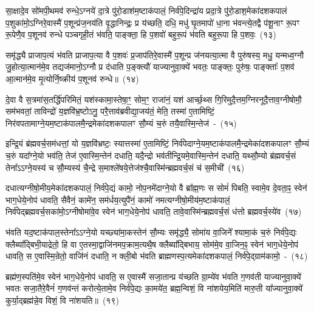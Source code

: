 सा॒क्षादे॒व सो॑मपी॒थमव॑ रुन्धे॒\-ऽग्नये॑ दा॒त्रे पु॑रो॒डाश॑म॒ष्टा\-क॑पालं॒ निर्व॑पे॒दिन्द्रा॑य प्रदा॒त्रे पु॑रो॒डाश॒मेका॑\-दश\-कपालं प॒शुका॑मो॒\-ऽग्निरे॒वास्मै॑ प॒शून्प्र॑ज॒नय॑ति वृ॒द्धानिन्द्रः॒ प्र य॑च्छति॒ दधि॒ मधु॑ घृ॒तमापो॑ धा॒ना भ॑वन्त्ये॒तद्वै प॑शू॒नाꣳ रू॒पꣳ रू॒पेणै॒व प॒शूनव॑ रुन्धे पञ्चगृही॒तं भ॑वति॒ पाङ्क्ता॒ हि प॒शवो॑ बहुरू॒पं भ॑वति बहुरू॒पा हि प॒शवः॒~(१३)\ip

समृ॑द्ध्यै प्राजाप॒त्यं भ॑वति प्राजाप॒त्या वै प॒शवः॑ प्र॒जा\-प॑तिरे॒वास्मै॑ प॒शून्प्र ज॑नयत्या॒त्मा वै पुरु॑षस्य॒ मधु॒ यन्मध्व॒ग्नौ जु॒होत्या॒त्मान॑मे॒व तद्यज॑मानो॒\-ऽग्नौ प्र द॑धाति प॒ङ्क्त्यौ॑ याज्यानुवा॒क्ये॑ भवतः॒ पाङ्क्तः॒ पुरु॑षः॒ पाङ्क्ताः᳚ प॒शव॑ आ॒त्मान॑मे॒व मृ॒त्योर्नि॒ष्क्रीय॑ प॒शूनव॑ रुन्धे॥~(१४)\ip

{\anuvakamend[{इ॒न्द्रि॒ये᳚\-ऽस्मि॒न्भूम्या॑ ए॒तामिन्द्रः॒ स्यात्तस्मै॒ सोमो॑ बहुरू॒पा हि प॒शव॒ एक॑चत्वारिꣳशच्च}]}

दे॒वा वै स॒त्रमा॑स॒तर्द्धि॑परिमितं॒ यश॑स्कामा॒स्तेषा॒ꣳ॒ सोम॒ꣳ॒ राजा॑नं॒ यश॑ आर्च्छ॒थ्स गि॒रिमुदै॒त्तम॒ग्निरनूदै॒त्ताव॒ग्नी\-षोमौ॒ सम॑भवतां॒ ताविन्द्रो॑ य॒ज्ञवि॑भ्र॒ष्टो\-ऽनु॒ परै॒त्ताव॑ब्रवीद्या॒जय॑तं॒ मेति॒ तस्मा॑ ए॒तामिष्टिं॒ निर॑वपता\-माग्ने॒य\-म॒ष्टाक॑पाल\-मै॒न्द्रमेका॑\-दश\-कपालꣳ सौ॒म्यं च॒रुं तयै॒वास्मि॒न्तेज॑~-~(१५)\ip

इन्द्रि॒यं ब्र॑ह्मवर्च॒सम॑धत्तां॒ यो य॒ज्ञवि॑भ्रष्टः॒ स्यात्तस्मा॑ ए॒तामिष्टिं॒ निर्व॑पेदाग्ने॒यम॒ष्टा\-क॑पालमै॒न्द्र\-मेका॑\-दश\-कपालꣳ सौ॒म्यं च॒रुं यदा᳚ग्ने॒यो भव॑ति॒ तेज॑ ए॒वास्मि॒न्तेन॑ दधाति॒ यदै॒न्द्रो भव॑तीन्द्रि॒यमे॒वास्मि॒न्तेन॑ दधाति॒ यथ्सौ॒म्यो ब्र॑ह्मवर्च॒सं तेना᳚\-ऽऽ\-ग्ने॒यस्य॑ च सौ॒म्यस्य॑ चै॒न्द्रे स॒माश्ले॑षये॒त्तेज॑श्चै॒वास्मि॑न्ब्रह्मवर्च॒सं च॑ स॒मीची॑~(१६)\ip

दधात्यग्नीषो॒मीय॒मेका॑\-दश\-कपालं॒ निर्व॑पे॒द्यं कामो॒ नोप॒नमे॑दा\-ग्ने॒यो वै ब्रा᳚ह्म॒णः स सोमं॑ पिबति॒ स्वामे॒व दे॒वता॒ꣴ॒ स्वेन॑ भाग॒\-धेये॒नोप॑ धावति॒ सैवैनं॒ कामे॑न॒ सम॑र्धय॒त्युपै॑नं॒ कामो॑ नमत्यग्नीषो॒मीय॑म॒ष्टा\-क॑पालं॒ निर्व॑पेद्ब्रह्मवर्च॒सका॑मो॒\-ऽग्नी\-षोमा॑वे॒व स्वेन॑ भाग॒\-धेये॒नोप॑ धावति॒ तावे॒वास्मि॑न्ब्रह्मवर्च॒सं ध॑त्तो ब्रह्मवर्च॒स्ये॑व~(१७)\ip

भ॑वति यद॒ष्टाक॑पाल॒स्तेना᳚\-ऽऽ\-ग्ने॒यो यच्छ्या॑मा॒कस्तेन॑ सौ॒म्यः समृ॑द्ध्यै॒ सोमा॑य वा॒जिने᳚ श्यामा॒कं च॒रुं निर्व॑पे॒द्यः क्लैब्या᳚द्बिभी॒याद्रेतो॒ हि वा ए॒तस्मा॒द्वाजि॑नमप॒क्राम॒त्यथै॒ष क्लैब्या᳚द्बिभाय॒ सोम॑मे॒व वा॒जिन॒ꣴ॒ स्वेन॑ भाग॒\-धेये॒नोप॑ धावति॒ स ए॒वास्मि॒न्रेतो॒ वाजि॑नं दधाति॒ न क्ली॒बो भ॑वति ब्राह्मणस्प॒त्यमेका॑\-दश\-कपालं॒ निर्व॑पे॒द्ग्राम॑कामो॒~-~(१८)\ip

ब्रह्म॑ण॒स्पति॑मे॒व स्वेन॑ भाग॒\-धेये॒नोप॑ धावति॒ स ए॒वास्मै॑ सजा॒तान्प्र य॑च्छति ग्रा॒म्ये॑व भ॑वति ग॒णव॑ती याज्यानुवा॒क्ये॑ भवतः सजा॒तैरे॒वैनं॑ ग॒णव॑न्तं करोत्ये॒तामे॒व निर्व॑पे॒द्यः का॒मये॑त॒ ब्रह्म॒न्विशं॒ वि ना॑शयेय॒मिति॑ मारु॒ती या᳚ज्यानुवा॒क्ये॑ कुर्या॒द्ब्रह्म॑न्ने॒व विशं॒ वि ना॑शयति॥~(१९)\ip

